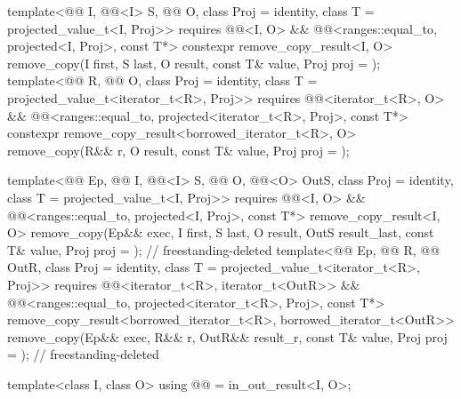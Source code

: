 \begin{codeblock}
{{    template<@@ I, @@<I> S, @@ O,
             class Proj = identity, class T = projected_value_t<I, Proj>>
      requires @@<I, O> &&
               @@<ranges::equal_to, projected<I, Proj>, const T*>
      constexpr remove_copy_result<I, O>
        remove_copy(I first, S last, O result, const T& value, Proj proj = {});
    template<@@ R, @@ O, class Proj = identity,
             class T = projected_value_t<iterator_t<R>, Proj>>
      requires @@<iterator_t<R>, O> &&
               @@<ranges::equal_to,
                                         projected<iterator_t<R>, Proj>, const T*>
      constexpr remove_copy_result<borrowed_iterator_t<R>, O>
        remove_copy(R&& r, O result, const T& value, Proj proj = {});

    template<@@ Ep, @@ I, @@<I> S,
             @@ O, @@<O> OutS,
             class Proj = identity, class T = projected_value_t<I, Proj>>
      requires @@<I, O> &&
               @@<ranges::equal_to, projected<I, Proj>, const T*>
      remove_copy_result<I, O>
        remove_copy(Ep&& exec, I first, S last, O result, OutS result_last, const T& value,
                    Proj proj = {});                                        // freestanding-deleted
    template<@@ Ep, @@ R, @@ OutR,
             class Proj = identity, class T = projected_value_t<iterator_t<R>, Proj>>
      requires @@<iterator_t<R>, iterator_t<OutR>> &&
               @@<ranges::equal_to,
                                         projected<iterator_t<R>, Proj>, const T*>
      remove_copy_result<borrowed_iterator_t<R>, borrowed_iterator_t<OutR>>
        remove_copy(Ep&& exec, R&& r, OutR&& result_r, const T& value,
                    Proj proj = {});                                        // freestanding-deleted

    template<class I, class O>
      using @@ = in_out_result<I, O>;

}}
\end{codeblock}
